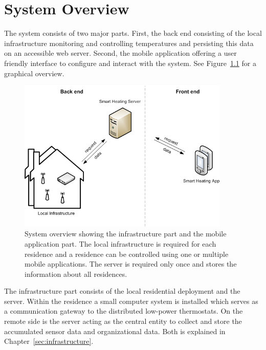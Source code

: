 
\chapter{System Overview}
\label{sec:systemoverview}

The system consists of two major parts.
First, the back end consisting of the local infrastructure monitoring and controlling temperatures and persisting this data on an accessible web server.
Second, the mobile application offering a user friendly interface to configure and interact with the system.
See Figure~\ref{fig:system_overview} for a graphical overview.

\begin{figure}[h]
\begin{center}
\includegraphics[width=0.9\textwidth]{images/SystemOverview.png}
\end{center}
\caption{
	System overview showing the infrastructure part and the mobile application part.
	The local infrastructure is required for each residence and a residence can be controlled using one or multiple mobile applications.
	The server is required only once and stores the information about all residences.
	}
\label{fig:system_overview}
\end{figure}

The infrastructure part consists of the local residential deployment and the server.
Within the residence a small computer system is installed which serves as a communication gateway to the distributed low-power thermostats.
On the remote side is the server acting as the central entity to collect and store the accumulated sensor data and organizational data.
Both is explained in Chapter~\ref{sec:infrastructure}.

